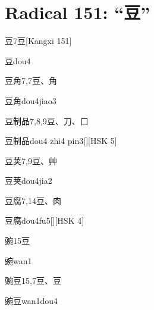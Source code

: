 
\section*{Radical 151: ``⾖''}

\begin{Entry}{豆}{7}{⾖}[Kangxi 151]
  \begin{Phonetics}{豆}{dou4}
  \end{Phonetics}
\end{Entry}

\begin{Entry}{豆角}{7,7}{⾖、⾓}
  \begin{Phonetics}{豆角}{dou4jiao3}
  \end{Phonetics}
\end{Entry}

\begin{Entry}{豆制品}{7,8,9}{⾖、⼑、⼝}
  \begin{Phonetics}{豆制品}{dou4 zhi4 pin3}[][HSK 5]
  \end{Phonetics}
\end{Entry}

\begin{Entry}{豆荚}{7,9}{⾖、⾋}
  \begin{Phonetics}{豆荚}{dou4jia2}
  \end{Phonetics}
\end{Entry}

\begin{Entry}{豆腐}{7,14}{⾖、⾁}
  \begin{Phonetics}{豆腐}{dou4fu5}[][HSK 4]
  \end{Phonetics}
\end{Entry}

\begin{Entry}{豌}{15}{⾖}
  \begin{Phonetics}{豌}{wan1}
  \end{Phonetics}
\end{Entry}

\begin{Entry}{豌豆}{15,7}{⾖、⾖}
  \begin{Phonetics}{豌豆}{wan1dou4}
  \end{Phonetics}
\end{Entry}


